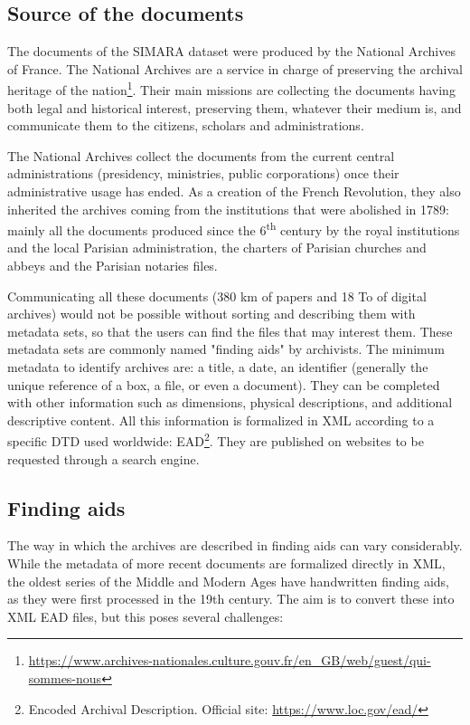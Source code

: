 \documentclass[runningheads]{llncs}
\begin{document}
\subsection{Source of the documents} 
The documents of the SIMARA dataset were produced by the National Archives of France. The National Archives are a service 
in charge of preserving the archival heritage of the nation\footnote{\url{https://www.archives-nationales.culture.gouv.fr/en\_GB/web/guest/qui-sommes-nous}}. Their main missions are collecting the documents having both legal and historical interest, preserving them, whatever their medium is, and communicate them to the citizens, scholars and administrations.

The National Archives collect the documents from the current central administrations (presidency, ministries, public corporations) once their administrative usage has ended.
As a creation of the French Revolution, they also inherited the archives coming from the institutions that were abolished in 1789: mainly all the documents produced since the 6\textsuperscript{th} century by the royal institutions and the local Parisian administration, the charters of Parisian churches and abbeys and the Parisian notaries files.

Communicating all these documents (380 km of papers and 18 To of digital archives) would not be possible without sorting and describing them with metadata sets, so that the users can find the files that may interest them. 
These metadata sets are commonly named "finding aids" by archivists. The minimum metadata to identify archives are: a title, a date, an identifier (generally the unique reference of a box, a file, or even a document). They can be completed with other information such as dimensions, physical descriptions, and additional descriptive content. All this information is formalized in XML according to a specific DTD used worldwide: EAD\footnote{Encoded Archival Description. Official site: \url{https://www.loc.gov/ead/}}. They are published on websites to be requested through a search engine.

\subsection{Finding aids}  

The way in which the archives are described in finding aids can vary considerably. 
While the metadata of more recent documents are formalized directly in XML, the oldest series of the Middle and Modern Ages have handwritten finding aids, as they were first processed in the 19th century. The aim is to convert these into XML EAD files, but this poses several challenges:
\end{document}
